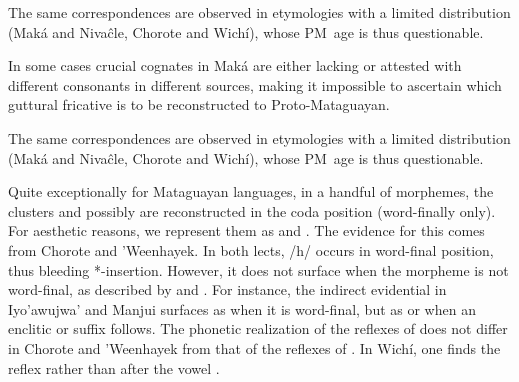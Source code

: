 \begin{exe}
    \ex \centipedepl
    \ex \cactus \label{ph-cactus}
    \ex \oldpl
    \ex \powderpl
    \ex \ropepl
    \ex \up \label{ph-up}
    \ex \fishwithhook
    \ex \wildcat
    \ex \platepl
    \ex \paloflojot
    \ex \spousewh
    \ex \marry
    \ex \healthy
    \ex \headpl
    \ex \caracarapl
    \ex \knee \label{qh-knee}
    \ex \wildbean
    \ex \teach
\end{exe}

The same correspondences are observed in etymologies with a limited distribution (Maká and Nivaĉle, Chorote and Wichí), whose PM~age is thus questionable.

\begin{exe}
    \ex \locustmn
    \ex \pacu
    \ex \bilecwpl
    \ex \mollef
    \ex \queenpalmf
    \ex \heartcw
\end{exe}

In some cases crucial cognates in Maká are either lacking or attested with different consonants in different sources, making it impossible to ascertain which guttural fricative is to be reconstructed to Proto-Mataguayan.

\begin{exe}
    \ex \coal
    \ex \youngersis
    \ex \thorncutjan
    \ex \roast
    \ex \nightmonkey
    \ex \girl
    \ex \mucus
    \ex \snore
    \ex \rhea
\end{exe}

The same correspondences are observed in etymologies with a limited distribution (Maká and Nivaĉle, Chorote and Wichí), whose PM~age is thus questionable.

\begin{exe}
    \ex \heavyv
    \ex \orphancwpl
    \ex \throwcw
    \ex \doradocw
\end{exe}

Quite exceptionally for Mataguayan languages, in a handful of morphemes, the clusters  and possibly  are reconstructed in the coda position (word-finally only). For aesthetic reasons, we represent them as  and . The evidence for this comes from Chorote and 'Weenhayek. In both lects, /h/ occurs in word-final position, thus bleeding *\mbox{-}insertion. However, it does not surface when the morpheme is not word-final, as described by \citet{KC94} and \citet{JC14b}. For instance, the indirect evidential in Iyo'awujwa' and Manjui surfaces as  when it is word-final, but as  or  when an enclitic or suffix follows. The phonetic realization of the reflexes of  does not differ in Chorote and ’Weenhayek from that of the reflexes of . In Wichí, one finds the reflex  rather than  after the vowel  .

